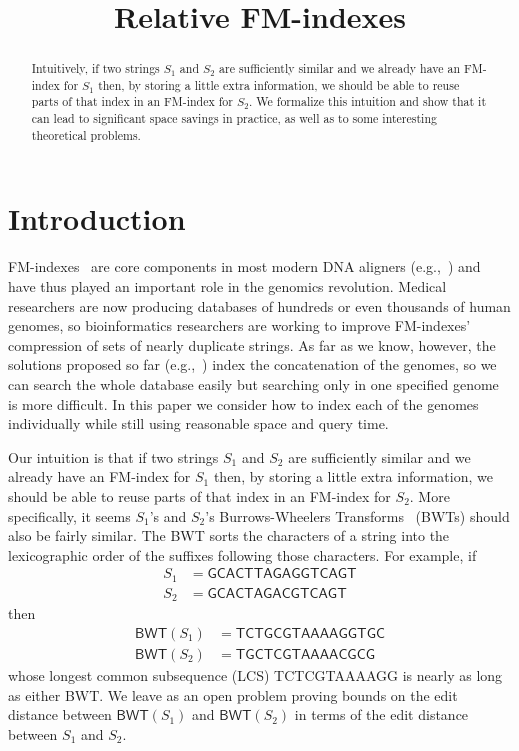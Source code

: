 \documentclass{llncs}
\newcommand{\BWT}
  {\ensuremath{\mathsf{BWT}}}
\begin{document}
\title{Relative FM-indexes}
\maketitle

\begin{abstract}
Intuitively, if two strings $S_1$ and $S_2$ are sufficiently similar and we already have an FM-index for $S_1$ then, by storing a little extra information, we should be able to reuse parts of that index in an FM-index for $S_2$.  We formalize this intuition and show that it can lead to significant space savings in practice, as well as to some interesting theoretical problems.
\end{abstract}


\section{Introduction}
\label{sec:introduction}

FM-indexes~\cite{FM05} are core components in most modern DNA aligners (e.g.,~\cite{LTPS09,LD09,LYLLYKW09}) and have thus played an important role in the genomics revolution.  Medical researchers are now producing databases of hundreds or even thousands of human genomes, so bioinformatics researchers are working to improve FM-indexes' compression of sets of nearly duplicate strings.  As far as we know, however, the solutions proposed so far (e.g.,~\cite{FGHP??,MNSV10}) index the concatenation of the genomes, so we can search the whole database easily but searching only in one specified genome is more difficult.  In this paper we consider how to index each of the genomes individually while still using reasonable space and query time.

Our intuition is that if two strings $S_1$ and $S_2$ are sufficiently similar and we already have an FM-index for $S_1$ then, by storing a little extra information, we should be able to reuse parts of that index in an FM-index for $S_2$.  More specifically, it seems $S_1$'s and $S_2$'s Burrows-Wheelers Transforms~\cite{BW94} (BWTs) should also be fairly similar.  The BWT sorts the characters of a string into the lexicographic order of the suffixes following those characters.  For example, if
\begin{align*}
S_1 & = \mathsf{GCACTTAGAGGTCAGT}\\
S_2 & = \mathsf{GCACTAGACGTCAGT}
\end{align*}
then
\begin{align*}
\BWT (S_1) & = \mathsf{TCTGCGTAAAAGGTGC}\\
\BWT (S_2) & = \mathsf{TGCTCGTAAAACGCG}
\end{align*}
whose longest common subsequence (LCS) {\sf TCTCGTAAAAGG} is nearly as long as either BWT.  We leave as an open problem proving bounds on the edit distance between \(\BWT (S_1)\) and \(\BWT (S_2)\) in terms of the edit distance between $S_1$ and $S_2$.
\end{document}
